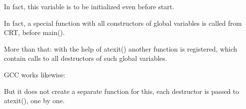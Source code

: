In fact, this variable is to be initialized even before \main start.








In fact, a special function with all constructors of global variables is called from \ac{CRT}, before
main().

More than that: with the help of atexit() another function is registered, 
which contain calls to all destructors of such global variables.

GCC works likewise:



But it does not create a separate function for this, 
each destructor is passed to atexit(), one by one.


